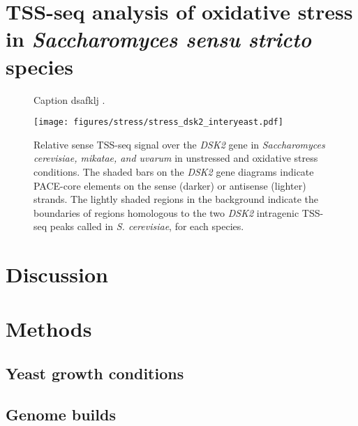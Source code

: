 \section{TSS-seq analysis of oxidative stress in \textit{Saccharomyces sensu stricto} species}

\lipsum[1]

\begin{figure}
    \caption[A figure showing TSS-seq coverage over oxidative-stress-induced TSSs in the three species.]{Caption dsafklj .}
\end{figure}

\begin{figure}
    \texttt{[image: figures/stress/stress\_dsk2\_interyeast.pdf]}
    \caption[Sense TSS-seq signal over the \textit{DSK2} gene in \textit{Saccharomyces cerevisiae, mikatae, and uvarum} in unstressed and oxidative stress conditions.]{Relative sense TSS-seq signal over the \textit{DSK2} gene in \textit{Saccharomyces cerevisiae, mikatae, and uvarum} in unstressed and oxidative stress conditions. The shaded bars on the \textit{DSK2} gene diagrams indicate PACE-core elements on the sense (darker) or antisense (lighter) strands. The lightly shaded regions in the background indicate the boundaries of regions homologous to the two \textit{DSK2} intragenic TSS-seq peaks called in \textit{S. cerevisiae}, for each species.}
    \label{fig:stress_dsk2_interyeast}
\end{figure}

\section{Discussion}

\lipsum[1]

\section{Methods}

\subsection{Yeast growth conditions}

\subsection{Genome builds}

